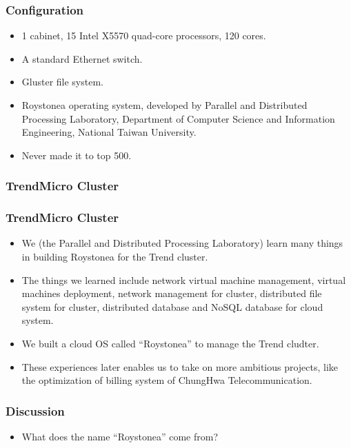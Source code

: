 \documentclass{beamer}
\begin{document}
\begin{CJK}{UTF8}{bsmi}
\begin{frame}
\frametitle{Configuration}
\begin{itemize}
\item 1 cabinet, 15 Intel X5570 quad-core processors, 120 cores.
\item A standard Ethernet switch.
\item Gluster file system.
\item Roystonea operating system, developed by Parallel and
  Distributed Processing Laboratory, Department of Computer Science
  and Information Engineering, National Taiwan University.
\item Never made it to top 500.
\end{itemize}
\end{frame}

\begin{frame}
\frametitle{TrendMicro Cluster}
\centerline{}
\end{frame}

\begin{frame}
\frametitle{TrendMicro Cluster}
\centerline{}
\end{frame}

\begin{frame}
\begin{itemize}
\item We (the Parallel and Distributed Processing Laboratory) learn
  many things in building Roystonea for the Trend cluster.
\item The things we learned include network virtual machine management,
  virtual machines deployment, network management for cluster,
  distributed file system for cluster, distributed database and NoSQL
  database for cloud system.
\item We built a cloud OS called ``Roystonea'' to manage the Trend
  cludter.
\item These experiences later enables us to take on more ambitious
  projects, like the optimization of billing system of ChungHwa
  Telecommunication.
\end{itemize}
\end{frame}


\begin{frame}
\frametitle{Discussion}
\begin{itemize}
\item What does the name ``Roystonea'' come from?
\end{itemize}
\end{frame}


\end{CJK}
\end{document}
